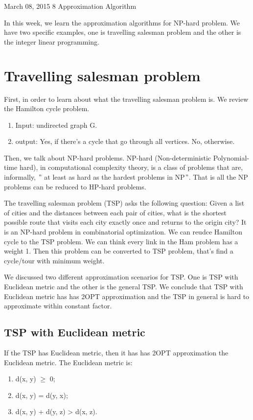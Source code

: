 \documentclass[usletter]{article}
\begin{document}
           {March 08, 2015}                          %
           {8}                                       %
           {Approximation Algorithm}  %

\noindent
In this week, we learn the approximation algorithms for NP-hard problem. We have two specific examples, one is travelling salesman problem and the other is the integer linear programming.

\section{Travelling salesman problem}
First, in order to learn about what the travelling salesman problem is. We review the Hamilton cycle problem.
\begin{enumerate}
	\item Input: undirected graph G.
	\item output: Yes, if there's a cycle that go through all vertices. No, otherwise.
\end{enumerate}

Then, we talk about NP-hard problems. NP-hard (Non-deterministic Polynomial-time hard), in computational complexity theory, is a class of problems that are, informally, $"$ at least as hard as the hardest problems in NP$"$. That is all the NP problems can be reduced to HP-hard problems. 

The travelling salesman problem (TSP) asks the following question: Given a list of cities and the distances between each pair of cities, what is the shortest possible route that visits each city exactly once and returns to the origin city? It is an NP-hard problem in combinatorial optimization.  We can reudce Hamilton cycle to the TSP problem. We can think every link in the Ham problem has a weight 1. Then this problem can be converted to TSP problem, that's find a cycle/tour with minimum weight. 

We discussed two different approximation scenarios for TSP. One is TSP with Euclidean metric and the other is the general TSP. We conclude that TSP with Euclidean metric has has 2OPT approximation and the TSP in general is hard to approximate within constant factor.

\subsection{TSP with Euclidean metric}
If the TSP has Euclidean metric, then it has has 2OPT approximation the Euclidean metric. The Euclidean metric is:
\begin{enumerate}
	\item d(x, y) $\ge$ 0;
	\item d(x, y) = d(y, x);
	\item d(x, y) + d(y, z) > d(x, z).
\end{enumerate}
\end{document}

